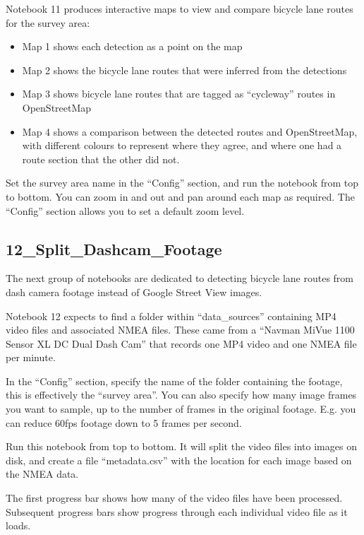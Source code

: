 \documentclass[11pt,twoside]{report}
\begin{document}
Notebook 11 produces interactive maps to view and compare bicycle lane routes for the survey area:

\begin{itemize}
\item{Map 1 shows each detection as a point on the map}
\item{Map 2 shows the bicycle lane routes that were inferred from the detections}
\item{Map 3 shows bicycle lane routes that are tagged as ``cycleway'' routes in OpenStreetMap}
\item{Map 4 shows a comparison between the detected routes and OpenStreetMap, with different colours to represent where they agree, and where one had a route section that the other did not.}	
\end{itemize}

Set the survey area name in the ``Config'' section, and run the notebook from top to bottom.  You can zoom in and out and pan around each map as required.  The ``Config'' section allows you to set a default zoom level.


\subsection{12\_Split\_Dashcam\_Footage}
\label{a12}

The next group of notebooks are dedicated to detecting bicycle lane routes from dash camera footage instead of Google Street View images.

Notebook 12 expects to find a folder within ``data\_sources'' containing MP4 video files and associated NMEA files.  These came from a ``Navman MiVue 1100 Sensor XL DC Dual Dash Cam'' that records one MP4 video and one NMEA file per minute.

In the ``Config'' section, specify the name of the folder containing the footage, this is effectively the ``survey area''.  You can also specify how many image frames you want to sample, up to the number of frames in the original footage.  E.g. you can reduce 60fps footage down to 5 frames per second.

Run this notebook from top to bottom.  It will split the video files into images on disk, and create a file ``metadata.csv'' with the location for each image based on the NMEA data.

The first progress bar shows how many of the video files have been processed.  Subsequent progress bars show progress through each individual video file as it loads.
\end{document}
